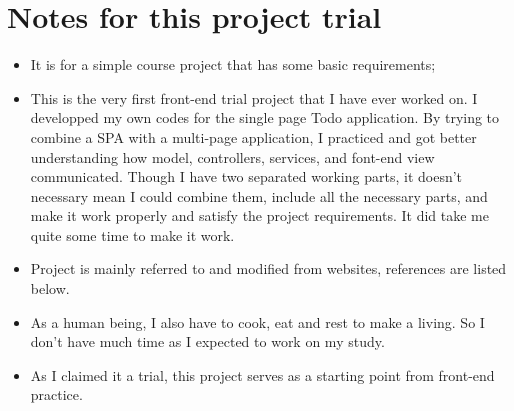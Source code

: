 \documentclass[9pt,b5paper]{article}
\begin{document}
\section{Notes for this project trial}
\label{sec-10}
\begin{itemize}
\item It is for a simple course project that has some basic requirements;
\item This is the very first front-end trial project that I have ever worked on. I developped my own codes for the single page Todo application. By trying to combine a SPA with a multi-page application, I practiced and got better understanding how model, controllers, services, and font-end view communicated. Though I have two separated working parts, it doesn't necessary mean I could combine them, include all the necessary parts, and make it work properly and satisfy the project requirements. It did take me quite some time to make it work.
\item Project is mainly referred to and modified from websites, references are listed below.
\item As a human being, I also have to cook, eat and rest to make a living. So I don't have much time as I expected to work on my study.
\item As I claimed it a trial, this project serves as a starting point from front-end practice.
\end{itemize}
\end{document}
